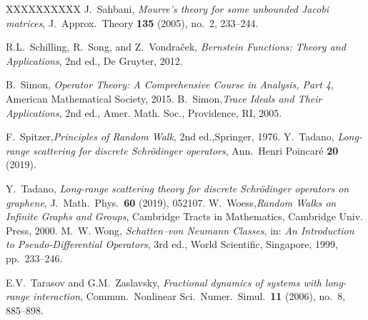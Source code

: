 \documentclass[10pt]{amsart}
\newcommand{\1}{{\mathbb{I}}}
\numberwithin{equation}{section}
\begin{document}
\begin{thebibliography}{XXXXXXXXXX}
 J.\ Sahbani, \emph{Mourre's theory for some unbounded Jacobi matrices}, J.\ Approx.\ Theory {\bf 135} (2005), no.\ 2, 233--244.

 R.L.\ Schilling, R.\ Song, and Z.\ Vondra\v{c}ek, \emph{Bernstein Functions: Theory and Applications}, 2nd ed., De Gruyter, 2012.


 B.\ Simon, \emph{Operator Theory: A Comprehensive Course in Analysis, Part 4}, American Mathematical Society, 2015.
B.~Simon,\emph{Trace Ideals and Their Applications}, 2nd ed.,
Amer. Math. Soc., Providence, RI, 2005.

 F.~Spitzer,\emph{Principles of Random Walk}, 2nd ed.,Springer, 1976.
 Y.\ Tadano, \emph{Long-range scattering for discrete Schr\"odinger operators}, Ann.\ Henri Poincar\'e {\bf 20} (2019).

 Y.\ Tadano, \emph{Long-range scattering theory for discrete Schr\"odinger operators on graphene}, J.\ Math.\ Phys.\ {\bf 60} (2019), 052107.
 W.~Woess,\emph{Random Walks on Infinite Graphs and Groups}, Cambridge Tracts in Mathematics, Cambridge Univ. Press, 2000.
M.~W. Wong,
\newblock \emph{Schatten--von Neumann Classes},
\newblock in: \emph{An Introduction to Pseudo-Differential Operators},
3rd ed., World Scientific, Singapore, 1999, pp.~233--246.

 E.V.\ Tarasov and G.M.\ Zaslavsky, \emph{Fractional dynamics of systems with long-range interaction}, Commun.\ Nonlinear Sci.\ Numer.\ Simul.\ {\bf 11} (2006), no.\ 8, 885--898.



\end{thebibliography}
\end{document}
